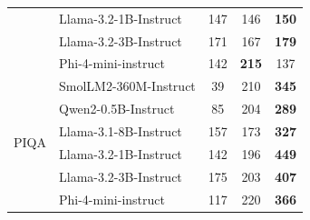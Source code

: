 \begin{table}[h]
\begin{tabular}{@{}llccc@{}}
  & Llama-3.2-1B-Instruct         & 147 & 146 & \textbf{150} \\
  & Llama-3.2-3B-Instruct         & 171 & 167 & \textbf{179} \\
  & Phi-4-mini-instruct           & 142 & \textbf{215} & 137 \\
\midrule
\multirow{6}{*}{PIQA} 
  & SmolLM2-360M-Instruct         & 39  & 210 & \textbf{345} \\
  & Qwen2-0.5B-Instruct           & 85  & 204 & \textbf{289} \\
  & Llama-3.1-8B-Instruct         & 157 & 173 & \textbf{327} \\
  & Llama-3.2-1B-Instruct         & 142 & 196 & \textbf{449} \\
  & Llama-3.2-3B-Instruct         & 175 & 203 & \textbf{407} \\
  & Phi-4-mini-instruct           & 117 & 220 & \textbf{366} \\
\bottomrule
\end{tabular}
\label{tab:steering_tokens}
\end{table}